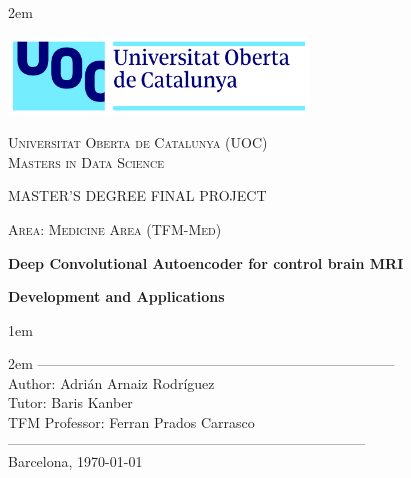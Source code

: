 \newpage
\thispagestyle{empty}

\baselineskip 2em


\centerline{\includegraphics[width=0.6\textwidth]{images/UOC-logo}}
\begin{center}
\textsc{Universitat Oberta de Catalunya (UOC) \\
 Masters in Data Science\\}


\vspace*{1.5cm}

\textsc{\Large MASTER'S DEGREE FINAL PROJECT}

\vspace*{0.5cm}

\textsc{\large Area: Medicine Area (TFM-Med)}



\vspace*{2.0cm}

\textbf{\Large Deep Convolutional Autoencoder for control brain MRI}

\textbf{\large Development and Applications}

\vspace{2.5cm}
\baselineskip 1em

\baselineskip 2em
-----------------------------------------------------------------------------\\
Author:     Adrián Arnaiz Rodríguez\\
Tutor:      Baris Kanber\\
TFM Professor: Ferran Prados Carrasco\\
-----------------------------------------------------------------------------\\
\vspace*{1.5cm}
Barcelona, \today

\end{center}

\newpage
\pagestyle{empty}
\hfill
